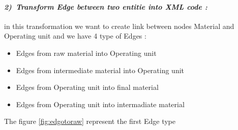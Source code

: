\paragraph{\emph{2)~Transform Edge between two entitie into XML code :} } in this transformation 
we want to create link between nodes Material and Operating unit 
and we have  4 type of Edges : 
\begin{itemize}

\newcommand{\localtextbulletone}{\textcolor{gray}{\raisebox{.45ex}{\rule{.6ex}{.6ex}}}}
\renewcommand{\labelitemi}{\localtextbulletone}
	\item Edges from raw material into Operating unit
	\item Edges from intermediate material into Operating unit
	
	\item Edges from  Operating unit into final material
	\item Edges from  Operating unit into intermadiate material 
\end{itemize}
The figure \ref{fig:edgotoraw} represent the first Edge type 
\vspace{1cm}

